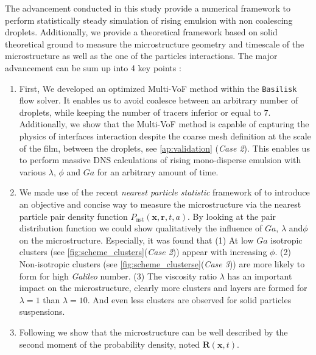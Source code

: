 


The advancement conducted in this study provide a numerical framework to perform statistically steady simulation of rising emulsion with non coalescing droplets.
Additionally, we provide a theoretical framework based on solid theoretical ground to measure the microstructure geometry and timescale of the microstructure as well as the one of the particles interactions.
The major advancement can be sum up into 4 key points :
\begin{enumerate}
    \item First, We developed an optimized Multi-VoF method within the \texttt{Basilisk} flow solver. 
    It enables us to avoid coalesce between an arbitrary number of droplets, while keeping the number of tracers inferior or equal to $7$. 
    Additionally, we show that the Multi-VoF method is capable of capturing the physics of interfaces interaction despite the coarse mesh definition at the scale of the film, between the droplets, see \ref{ap:validation} (\textit{Case 2}). 
    This enables us to perform massive DNS calculations of rising mono-disperse emulsion with various $\lambda$, $\phi$ and $Ga$ for an arbitrary amount of time.
    \item We made use of the recent \textit{nearest particle statistic} framework of \citet{zhang2023evolution} to introduce an objective and concise way to measure the microstructure via the nearest particle pair density function $P_\text{nst}(\textbf{x},\textbf{r},t,a)$. 
    By looking at the pair distribution function we could show qualitatively the influence of $Ga$, $\lambda$ and$\phi$ on the microstructure.
    Especially, it was found that 
    (1) At low $Ga$ isotropic clusters (see \ref{fig:scheme_clusters}(\textit{Case 2})) appear with increasing $\phi$. 
    (2) Non-isotropic clusters (see \ref{fig:scheme_clusterse}(\textit{Case 3})) are more likely to form for high \textit{Galileo} number.
    (3) The viscosity ratio $\lambda$ has an important impact on the microstructure, clearly more  clusters and layers are formed for $\lambda = 1$ than $\lambda = 10$. 
    And even less clusters are observed for solid particles suspensions. 
    \item Following \citet{zhang2023evolution} we show that the microstructure can be well described by the second moment of the probability density, noted $\textbf{R}(\textbf{x},t)$. 

\end{enumerate}
